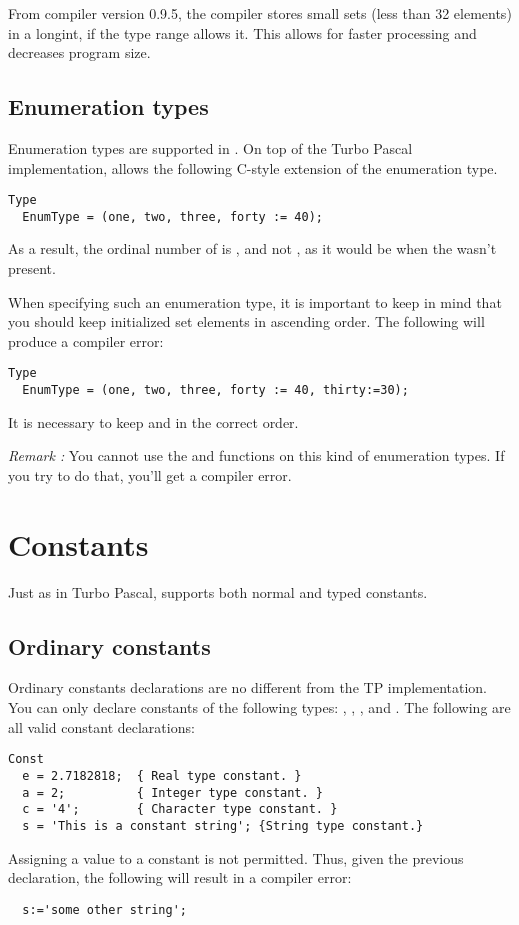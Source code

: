 \documentclass{report}
\begin{document}
From compiler version 0.9.5, the compiler stores small sets (less than 32
elements) in a longint, if the type range allows it. This allows for faster
processing and decreases program size.

\subsection{Enumeration types}

Enumeration types are supported in \fpk. On top of the Turbo Pascal
implementation, \fpk allows the following C-style extension of the
enumeration type.
\begin{verbatim}
Type
  EnumType = (one, two, three, forty := 40);
\end{verbatim}
As a result, the ordinal number of  is , and not ,
as it would be when the  wasn't present.

When specifying such an enumeration type, it is important to keep in mind
that you should keep initialized set elements in ascending order. The
following will produce a compiler error:
\begin{verbatim}
Type
  EnumType = (one, two, three, forty := 40, thirty:=30);
\end{verbatim}
It is necessary to keep  and  in the correct order.

{\em Remark :} You cannot use the  and  functions on
this kind of enumeration types. If you try to do that, you'll get a compiler
error.

\section{Constants}

Just as in Turbo Pascal, \fpk supports both normal and typed constants.
\subsection{Ordinary constants}
Ordinary constants declarations are no different from the TP implementation. 
You can only declare constants of the following types: ,
, , and . 
The following are all valid constant declarations:
\begin{verbatim}
Const
  e = 2.7182818;  { Real type constant. }
  a = 2;          { Integer type constant. }
  c = '4';        { Character type constant. }
  s = 'This is a constant string'; {String type constant.}
\end{verbatim}
Assigning a value to a constant is not permitted. Thus, given the previous
declaration, the following will result in a compiler error:
\begin{verbatim}
  s:='some other string';
\end{verbatim}
\end{document}
